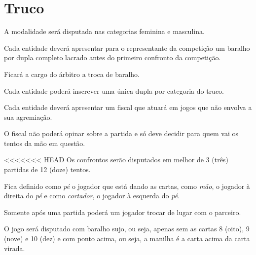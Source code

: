 {\let\clearpage\relax \chapter{Truco}}

\begin{article}
	A modalidade será disputada nas categorias feminina e masculina.
\end{article}

\begin{article}
	Cada entidade deverá apresentar para o representante da competição um baralho por dupla completo lacrado antes do primeiro confronto da competição.

	\begin{xparagraph}
		Ficará a cargo do árbitro a troca de baralho.
	\end{xparagraph}
\end{article}

\begin{article}
	Cada entidade poderá inscrever uma única dupla por categoria do truco.
\end{article}

\begin{article}
	Cada entidade deverá apresentar um fiscal que atuará em jogos que não envolva a sua agremiação.

	\begin{xparagraph}
		O fiscal não poderá opinar sobre a partida e só deve decidir para quem vai os tentos da mão em questão.
	\end{xparagraph}
\end{article}

\begin{article}
<<<<<<< HEAD
	Os confrontos serão disputados em melhor de 3 (três) partidas de 12 (doze) tentos.
\end{article}

\begin{article}
	Fica definido como \textit{pé} o jogador que está dando as cartas, como \textit{mão}, o jogador à direita do \textit{pé} e como \textit{cortador}, o jogador à esquerda do \textit{pé}.

	\begin{xparagraph}
		Somente após uma partida poderá um jogador trocar de lugar com o parceiro.
	\end{xparagraph}
\end{article}

\begin{article}
	O jogo será disputado com baralho sujo, ou seja, apenas sem as cartas 8 (oito), 9 (nove) e 10 (dez) e com ponto acima, ou seja, a manilha é a carta acima da carta virada.
\end{article}

